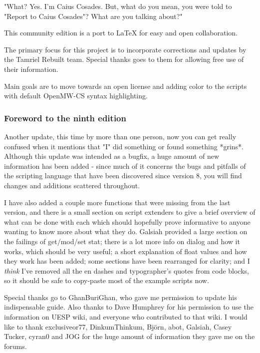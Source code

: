 \documentclass[oneside]{article}
\begin{document}
"What? Yes. I'm Caius Cosades. But, what do you mean, you were told to "Report to Caius Cosades"? What are you talking about?"

This community edition is a port to LaTeX for easy and open collaboration.

The primary focus for this project is to incorporate corrections and updates by the Tamriel Rebuilt team. Special thanks goes to them for allowing free use of their information.

Main goals are to move towards an open license and adding color to the scripts with default OpenMW-CS syntax highlighting.

\hypertarget{foreword-to-the-ninth-edition}{%
\subsubsection{\texorpdfstring{\hfill\break
Foreword to the ninth edition}{Foreword to the ninth edition}}\label{foreword-to-the-ninth-edition}}

Another update, this time by more than one person, now you can get really confused when it mentions that  "I" did something or found something *grins*. Although this update was intended as a bugfix, a huge amount of new information has been added - since much of it concerns the bugs and pitfalls of the scripting language that have been discovered since version 8, you will find changes and additions scattered throughout.

I have also added a couple more functions that were missing from the last version, and there is a small section on script extenders to give a brief overview of what can be done with each which should hopefully prove informative to anyone wanting to know more about what they do. Galsiah provided a large section on the failings of get/mod/set stat; there is a lot more info on dialog and how it works, which should be very useful; a short explanation of float values and how they work has been added; some sections have been rearranged for clarity; and I \emph{think} I've removed all the en dashes and typographer's quotes from code blocks, so it should be safe to copy-paste most of the example scripts now.

Special thanks go to GhanBuriGhan, who gave me permission to update his indispensable guide. Also thanks to Dave Humphrey for his permission to use the information on UESP wiki, and everyone who contributed to that wiki. I would like to thank exclusiveor77, DinkumThinkum, Björn, abot, Galsiah, Casey Tucker, cyran0 and JOG for the huge amount of information they gave me on the forums.
\end{document}
